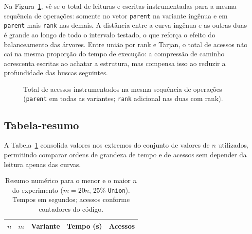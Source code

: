 Na Figura~\ref{fig:acessos}, vê-se o total de leituras e escritas instrumentadas para a mesma sequência de operações: somente no vetor \texttt{parent} na variante ingênua e em \texttt{parent} mais \texttt{rank} nas demais. A distância entre a curva ingênua e as outras duas é grande ao longo de todo o intervalo testado, o que reforça o efeito do balanceamento das árvores. Entre união por rank e Tarjan, o total de acessos não cai na mesma proporção do tempo de execução: a compressão de caminho acrescenta escritas ao achatar a estrutura, mas compensa isso ao reduzir a profundidade das buscas seguintes.

\begin{figure}[ht]
\centering
{}
\caption{Total de acessos instrumentados na mesma sequência de operações (\texttt{parent} em todas as variantes; \texttt{rank} adicional nas duas com rank).}
\label{fig:acessos}
\end{figure}

\subsection{Tabela-resumo}

A Tabela~\ref{tab:resumo} consolida valores nos extremos do conjunto de valores de $n$ utilizados, permitindo comparar ordens de grandeza de tempo e de acessos sem depender da leitura apenas das curvas.

\begin{table}[ht]
\centering
\caption{Resumo numérico para o menor e o maior $n$ do experimento ($m=20n$, 25\% \texttt{Union}). Tempos em segundos; acessos conforme contadores do código.}
\label{tab:resumo}
\begin{tabular}{c c l r r}
\hline
$n$ & $m$ & Variante & Tempo (s) & Acessos \\
\hline

\end{tabular}
\end{table}

